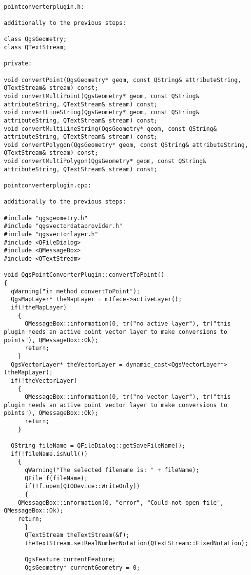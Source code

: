 \begin{verbatim}

pointconverterplugin.h:

additionally to the previous steps:

class QgsGeometry;
class QTextStream;

private:

void convertPoint(QgsGeometry* geom, const QString& attributeString, QTextStream& stream) const;
void convertMultiPoint(QgsGeometry* geom, const QString& attributeString, QTextStream& stream) const;
void convertLineString(QgsGeometry* geom, const QString& attributeString, QTextStream& stream) const;
void convertMultiLineString(QgsGeometry* geom, const QString& attributeString, QTextStream& stream) const;
void convertPolygon(QgsGeometry* geom, const QString& attributeString, QTextStream& stream) const;
void convertMultiPolygon(QgsGeometry* geom, const QString& attributeString, QTextStream& stream) const;

pointconverterplugin.cpp:

additionally to the previous steps:

#include "qgsgeometry.h"
#include "qgsvectordataprovider.h"
#include "qgsvectorlayer.h"
#include <QFileDialog>
#include <QMessageBox>
#include <QTextStream>

void QgsPointConverterPlugin::convertToPoint()
{
  qWarning("in method convertToPoint");
  QgsMapLayer* theMapLayer = mIface->activeLayer();
  if(!theMapLayer)
    {
      QMessageBox::information(0, tr("no active layer"), tr("this plugin needs an active point vector layer to make conversions to points"), QMessageBox::Ok);
      return;
    }
  QgsVectorLayer* theVectorLayer = dynamic_cast<QgsVectorLayer*>(theMapLayer);
  if(!theVectorLayer)
    {
      QMessageBox::information(0, tr("no vector layer"), tr("this plugin needs an active point vector layer to make conversions to points"), QMessageBox::Ok);
      return;
    }
  
  QString fileName = QFileDialog::getSaveFileName();
  if(!fileName.isNull())
    {
      qWarning("The selected filename is: " + fileName);
      QFile f(fileName);
      if(!f.open(QIODevice::WriteOnly))
      {
	QMessageBox::information(0, "error", "Could not open file", QMessageBox::Ok);
	return;
      }
      QTextStream theTextStream(&f);
      theTextStream.setRealNumberNotation(QTextStream::FixedNotation);

      QgsFeature currentFeature;
      QgsGeometry* currentGeometry = 0;


\end{verbatim}
